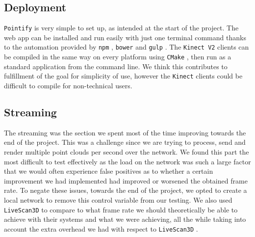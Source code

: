 \documentclass{article}
\begin{document}
\subsection{Deployment}
\texttt{Pointify} is very simple to set up, as intended at the start of the project. The web app can be installed and run easily with just one terminal command thanks to the automation provided by \texttt{npm} \cite{npm}, \texttt{bower} \cite{bower} and \texttt{gulp} \cite{gulp}. The \texttt{Kinect V2} clients can be compiled in the same way on every platform using \texttt{CMake} \cite{cmake}, then run as a standard application from the command line. We think this contributes to fulfillment of the goal for simplicity of use, however the \texttt{Kinect} clients could be difficult to compile for non-technical users. 

\subsection{Streaming}
The streaming was the section we spent most of the time improving towards the end of the project. This was a challenge since we are trying to process, send and render multiple point clouds per second over the network. We found this part the most difficult to test effectively as the load on the network was such a large factor that we would often experience false positives as to whether a certain improvement we had implemented had improved or worsened the obtained frame rate. To negate these issues, towards the end of the project, we opted to create a local network to remove this control variable from our testing. We also used \texttt{LiveScan3D} \cite{livescan} to compare to what frame rate we should theoretically be able to achieve with their systems and what we were achieving, all the while taking into account the extra overhead we had with respect to \texttt{LiveScan3D} \cite{livescan}.
\\\\
\end{document}
